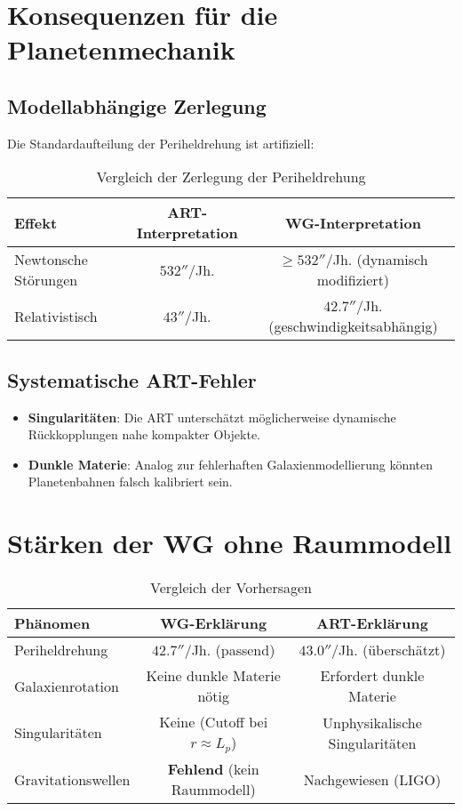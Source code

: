 \section{Konsequenzen für die Planetenmechanik}
\subsection{Modellabhängige Zerlegung}
Die Standardaufteilung der Periheldrehung ist artifiziell:
\begin{table}[ht]
\centering
\begin{tabular}{|l|c|c|}
\hline
\textbf{Effekt} & \textbf{ART-Interpretation} & \textbf{WG-Interpretation} \\ \hline
Newtonsche Störungen & $532''$/Jh. & $\geq 532''$/Jh. (dynamisch modifiziert) \\ \hline
Relativistisch & $43''$/Jh. & $42.7''$/Jh. (geschwindigkeitsabhängig) \\ \hline
\end{tabular}
\caption{Vergleich der Zerlegung der Periheldrehung}
\end{table}

\subsection{Systematische ART-Fehler}
\begin{itemize}
    \item \textbf{Singularitäten}: Die ART unterschätzt möglicherweise dynamische Rückkopplungen nahe kompakter Objekte.
    \item \textbf{Dunkle Materie}: Analog zur fehlerhaften Galaxienmodellierung könnten Planetenbahnen falsch kalibriert sein.
\end{itemize}

\section{Stärken der WG ohne Raummodell}
\begin{table}[ht]
\centering
\begin{tabular}{|l|c|c|}
\hline
\textbf{Phänomen} & \textbf{WG-Erklärung} & \textbf{ART-Erklärung} \\ \hline
Periheldrehung & $42.7''$/Jh. (passend) & $43.0''$/Jh. (überschätzt) \\ \hline
Galaxienrotation & Keine dunkle Materie nötig & Erfordert dunkle Materie \\ \hline
Singularitäten & Keine (Cutoff bei $r \approx L_p$) & Unphysikalische Singularitäten \\ \hline
Gravitationswellen & \textbf{Fehlend} (kein Raummodell) & Nachgewiesen (LIGO) \\ \hline
\end{tabular}
\caption{Vergleich der Vorhersagen}
\end{table}

